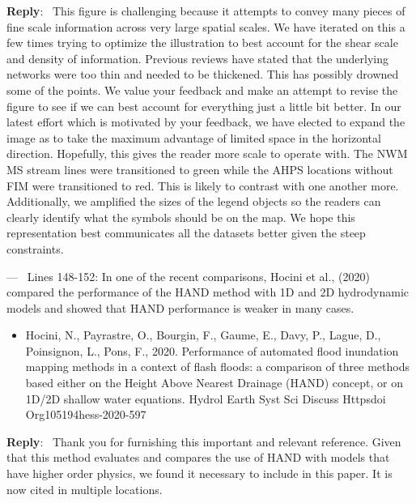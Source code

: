 \documentclass[11pt]{article}
\newcounter{reviewer}
\newcounter{point}[reviewer]
\renewcommand{\thepoint}{P\,\thereviewer.\arabic{point}}
\newenvironment{point}
   {\refstepcounter{point} \bigskip \noindent {\textbf{Reviewer~Point~\thepoint} } ---\ }
   {\par }
\newenvironment{reply}
   {\medskip \noindent \begin{sf}\textbf{Reply}:\  }
   {\medskip \end{sf}}
\begin{document}
\begin{reply}
This figure is challenging because it attempts to convey many pieces of fine scale information across very large spatial scales. 
We have iterated on this a few times trying to optimize the illustration to best account for the shear scale and density of information.
Previous reviews have stated that the underlying networks were too thin and needed to be thickened. 
This has possibly drowned some of the points.
We value your feedback and make an attempt to revise the figure to see if we can best account for everything just a little bit better.
In our latest effort which is motivated by your feedback, we have elected to expand the image as to take the maximum advantage of limited space in the horizontal direction.
Hopefully, this gives the reader more scale to operate with.
The NWM MS stream lines were transitioned to green while the AHPS locations without FIM were transitioned to red.
This is likely to contrast with one another more.
Additionally, we amplified the sizes of the legend objects so the readers can clearly identify what the symbols should be on the map.
We hope this representation best communicates all the datasets better given the steep constraints.
\end{reply}

\begin{point}
Lines 148-152: In one of the recent comparisons, Hocini et al., (2020) compared the performance of the HAND method with 1D and 2D hydrodynamic models and showed that HAND performance is weaker in many cases. 
\begin{itemize}
\item Hocini, N., Payrastre, O., Bourgin, F., Gaume, E., Davy, P., Lague, D., Poinsignon, L., Pons, F.,
2020. Performance of automated flood inundation mapping methods in a context of flash
floods: a comparison of three methods based either on the Height Above Nearest Drainage
(HAND) concept, or on 1D/2D shallow water equations. Hydrol Earth Syst Sci Discuss
Httpsdoi Org105194hess-2020-597
\end{itemize}
\end{point}
    
\begin{reply}
Thank you for furnishing this important and relevant reference.
Given that this method evaluates and compares the use of HAND with models that have higher order physics, we found it necessary to include in this paper.
It is now cited in multiple locations.
\end{reply}
\end{document}
